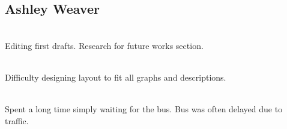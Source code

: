 \documentclass[12pt,journal,compsoc]{IEEEtran} %
\newcommand{\ditem}[2]{\item[#1] \hfill \\ #2}
\begin{document}
\subsection*{Ashley Weaver}
\begin{description}{}
\ditem{Cowrote report}{
	Editing first drafts.
	Research for future works section.
}
\ditem{Cowrote Poster}{
	Difficulty designing layout to fit all graphs and descriptions.
}
\ditem{Collected bus data}{
	Spent a long time simply waiting for the bus.
	Bus was often delayed due to traffic.
}
\end{description}
\end{document}
